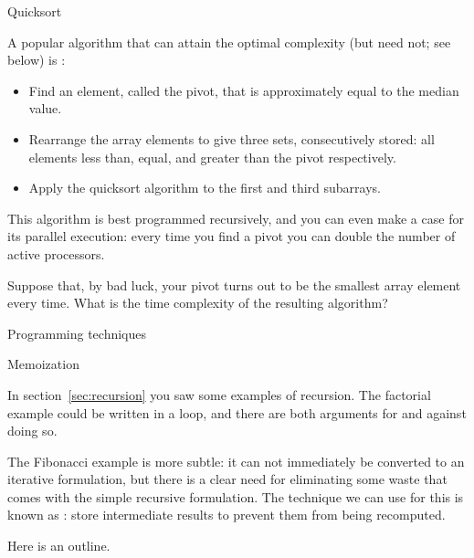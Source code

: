  {Quicksort}

A popular algorithm that can attain the optimal complexity (but need
not; see below) is :
\begin{itemize}
\item Find an element, called the pivot, that is approximately equal
  to the median value.
\item Rearrange the array elements to give three sets, consecutively
  stored: all elements less than, equal, and greater than the pivot
  respectively.
\item Apply the quicksort algorithm to the first and third subarrays.
\end{itemize}

This algorithm is best programmed recursively, and you can even make a
case for its parallel execution: every time you find a pivot you can
double the number of active processors.

\begin{exercise}
  Suppose that, by bad luck, your pivot turns out to be the smallest
  array element every time. What is the time complexity of the
  resulting algorithm?
\end{exercise}

 {Programming techniques}

 {Memoization}
\label{sec:memo}

In section~\ref{sec:recursion} you saw some examples of recursion. The
factorial example could be written in a loop, and there are both arguments
for and against doing so. 

The Fibonacci example is more subtle: it can not immediately be
converted to an iterative formulation, but there is a clear need for
eliminating some waste that comes with the simple recursive
formulation. The technique we can use for this is known as
: store intermediate results to prevent them
from being recomputed.

Here is an outline.
